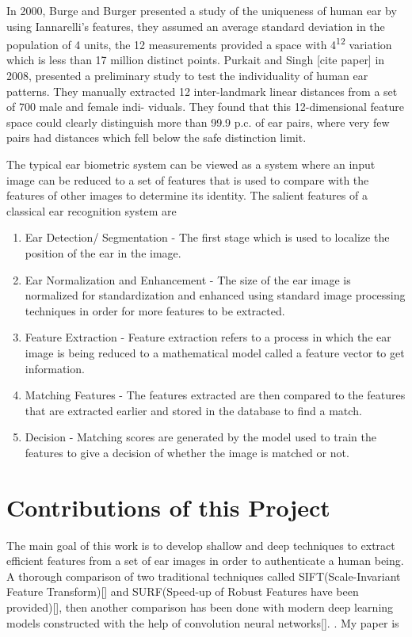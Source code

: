 In 2000, Burge and Burger presented a study of the uniqueness of human ear by using Iannarelli's features, they assumed an average standard deviation in the population of 4 units, the 12 measurements provided a space with 4\textsuperscript{12} variation which is less than 17 million distinct points. Purkait and Singh [cite paper] in 2008, presented a preliminary study to test the individuality of human ear patterns. They manually extracted 12 inter-landmark linear distances from a set of 700 male and female indi- viduals. They found that this 12-dimensional feature space could clearly distinguish more than 99.9 p.c. of ear pairs, where very few pairs had distances which fell below the safe distinction limit.

The typical ear biometric system can be viewed as a system where an input image can be reduced to a set of features that is used to compare with the features of other images to determine its identity. The salient features of a classical ear recognition system are\cite{abaza} 

\begin{enumerate}
\item Ear Detection/ Segmentation - The first stage which is used to localize the position of the ear in the image.
\item Ear Normalization and Enhancement - The size of the ear image is normalized for standardization and enhanced using standard image processing techniques in order for more features to be extracted.
\item Feature Extraction - Feature extraction refers to a process in which the ear image is being reduced to a mathematical model called a feature vector to get information.
\item Matching Features - The features extracted are then compared to the features that are extracted earlier and stored in the database to find a match.
\item Decision - Matching scores are generated by the model used to train the features to give a decision of whether the image is matched or not.
\end{enumerate}



\section{Contributions of this Project} The main goal of this work is to develop
shallow and deep techniques to extract efficient features from a set of ear images in order to authenticate a human being. A thorough comparison of two traditional techniques called SIFT(Scale-Invariant Feature Transform)[] and SURF(Speed-up of Robust Features have been provided)[], then another comparison has been done with modern deep learning models constructed with the help of convolution neural networks[].  \cite{harris}. My paper is \cite{sarkar}
